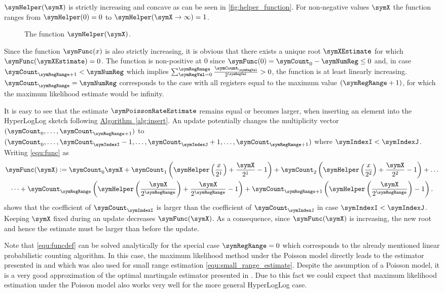 \documentclass[a4paper]{scrartcl}
\newcommand*{\algoref}[1]{\hyperref[#1]{Algorithm~\ref*{#1}}}
\begin{document}
$\symHelper(\symX)$ is strictly increasing and concave as can be seen in \autoref{fig:helper_function}. For non-negative values $\symX$ the function ranges from $\symHelper(0)=0$ to $\symHelper(\symX\rightarrow \infty)=1$.
\begin{figure}
\centering

\caption{The function $\symHelper(\symX)$.}
\label{fig:helper_function}
\end{figure}
Since the function $\symFunc(x)$ is also strictly increasing, it is obvious that there exists a unique root $\symXEstimate$ for which $\symFunc(\symXEstimate)=0$. The function is non-positive at 0 since $\symFunc(0)=\symCount_0-\symNumReg\leq 0$ and, in case $\symCount_{\symRegRange+1}<\symNumReg$ which implies $\sum_{\symRegVal=0}^\symRegRange \frac{\symCount_\symRegVal}{2^\symRegVal}>0$, the function is at least linearly increasing. $\symCount_{\symRegRange}=\symNumReg$ corresponds to the case with all registers equal to the maximum value $(\symRegRange+1)$, for which the maximum likelihood estimate would be infinity.

It is easy to see that the estimate $\symPoissonRateEstimate$ remains equal or becomes larger, when inserting an element into the HyperLogLog sketch following \algoref{alg:insert}. An update potentially changes the multiplicity vector $(\symCount_0,\ldots,\symCount_{\symRegRange+1})$ to $(\symCount_0,\ldots,\symCount_\symIndexI-1,\ldots,\symCount_\symIndexJ+1,\ldots,\symCount_{\symRegRange+1})$ where $\symIndexI < \symIndexJ$. Writing \eqref{equ:func} as 
\begin{multline}
\symFunc(\symX)
:=
\symCount_0 \symX
+
\symCount_1 \left(
\symHelper\left(\frac{x}{2^1}\right)
+\frac{\symX}{2^1}-1
\right)
+
\symCount_2 \left(
\symHelper\left(\frac{x}{2^2}\right)
+\frac{\symX}{2^2}-1
\right)
+
\ldots
\\
\dots
+
\symCount_\symRegRange
\left(
\symHelper\left(\frac{\symX}{2^\symRegRange}\right)
+\frac{\symX}{2^\symRegRange}-1
\right)
+
\symCount_{\symRegRange+1}
\left(
\symHelper\left(\frac{\symX}{2^{\symRegRange}}\right)
-1
\right).
\end{multline}
shows that the coefficient of $\symCount_\symIndexI$ is larger than the coefficient of $\symCount_\symIndexJ$ in case $\symIndexI < \symIndexJ$. Keeping $\symX$ fixed during an update decreases $\symFunc(\symX)$. As a consequence, since $\symFunc(\symX)$ is increasing, the new root and hence the estimate must be larger than before the update.

Note that \eqref{equ:funcdef} can be solved analytically for the special case $\symRegRange=0$ which corresponds to the already mentioned linear probabilistic counting algorithm. In this case, the maximum likelihood method under the Poisson model directly leads to the estimator presented in \cite{Whang1990} and which was also used for small range estimation \eqref{equ:small_range_estimate}. Despite the assumption of a Poisson model, it is a very good approximation of the optimal martingale estimator presented in \cite{Ting2014}. Due to this fact we could expect that maximum likelihood estimation under the Poisson model also works very well for the more  general HyperLogLog case.
\end{document}
